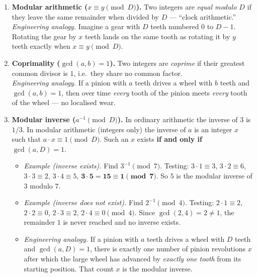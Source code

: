 \documentclass{amsart}
\theoremstyle{definition}
\theoremstyle{plain}
\theoremstyle{remark}
\begin{document}
\begin{enumerate}

  \item \textbf{Modular arithmetic (\(x \equiv y \pmod{D}\)).}
    Two integers are \emph{equal modulo \(D\)} if they leave the same remainder
    when divided by \(D\) --- ``clock arithmetic.''\\
    \textit{Engineering analogy.}  Imagine a gear with \(D\) teeth numbered
    \(0\) to \(D-1\).  Rotating the gear by \(x\) teeth lands on the same
    tooth as rotating it by \(y\) teeth exactly when \(x \equiv y \pmod{D}\).

  \item \textbf{Coprimality (\(\gcd(a,b)=1\)).}
    Two integers are \emph{coprime} if their greatest common divisor is \(1\),
    i.e.\ they share no common factor.\\
    \textit{Engineering analogy.}  If a pinion with \(a\) teeth drives a wheel
    with \(b\) teeth and \(\gcd(a,b)=1\), then over time \emph{every} tooth of
    the pinion meets \emph{every} tooth of the wheel --- no localised wear.

  \item \textbf{Modular inverse (\(a^{-1} \pmod{D}\)).}
    In ordinary arithmetic the inverse of \(3\) is \(1/3\).  In modular
    arithmetic (integers only) the inverse of \(a\) is an integer \(x\) such
    that \(a \cdot x \equiv 1 \pmod{D}\).  Such an \(x\) exists \textbf{if and
    only if} \(\gcd(a,D)=1\).

    \begin{itemize}
      \item \textit{Example (inverse exists).}  Find \(3^{-1} \pmod{7}\).
        Testing: \(3\cdot1\equiv3\), \(3\cdot2\equiv6\), \(3\cdot3\equiv2\),
        \(3\cdot4\equiv5\), \(\mathbf{3\cdot5=15\equiv1\pmod{7}}\).
        So \(5\) is the modular inverse of \(3\) modulo \(7\).

      \item \textit{Example (inverse does not exist).}  Find \(2^{-1}\pmod{4}\).
        Testing: \(2\cdot1\equiv2\), \(2\cdot2\equiv0\), \(2\cdot3\equiv2\),
        \(2\cdot4\equiv0\pmod{4}\).  Since \(\gcd(2,4)=2\neq1\), the remainder
        \(1\) is never reached and no inverse exists.

      \item \textit{Engineering analogy.}  If a pinion with \(a\) teeth drives a
        wheel with \(D\) teeth and \(\gcd(a,D)=1\), there is exactly one number
        of pinion revolutions \(x\) after which the large wheel has advanced by
        \emph{exactly one tooth} from its starting position.  That count \(x\)
        is the modular inverse.
    \end{itemize}

\end{enumerate}
\end{document}
